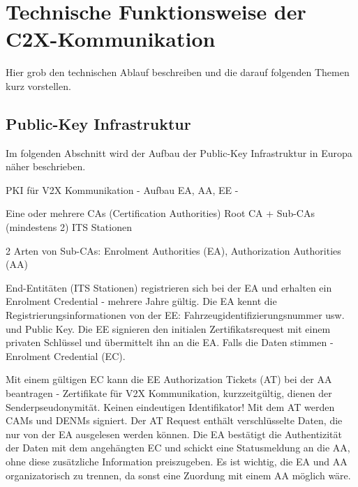 
\section{Technische  Funktionsweise der C2X-Kommunikation}
\label{ch:FirstContentSection}


Hier grob den technischen Ablauf beschreiben und die darauf folgenden Themen kurz vorstellen.

\subsection{Public-Key Infrastruktur}
\label{sec:FirstContentSection:FirstSubSection}
Im folgenden Abschnitt wird der Aufbau der Public-Key Infrastruktur in Europa näher beschrieben. 

PKI für V2X Kommunikation - Aufbau EA, AA, EE - \cite{Strubbe2017}

Eine oder mehrere CAs (Certification Authorities) 
Root CA + Sub-CAs (mindestens 2)
ITS Stationen

2 Arten von Sub-CAs: Enrolment Authorities (EA), Authorization Authorities (AA)

End-Entitäten (ITS Stationen) registrieren sich bei der EA und erhalten ein Enrolment Credential - mehrere Jahre gültig. Die EA kennt  die Registrierungsinformationen von der EE: Fahrzeugidentifizierungsnummer usw. und Public Key. Die EE signieren den initialen Zertifikatsrequest mit einem privaten Schlüssel und übermittelt ihn an die EA. Falls die Daten stimmen - Enrolment Credential (EC).

Mit einem gültigen EC kann die EE Authorization Tickets (AT) bei der AA beantragen - Zertifikate für V2X Kommunikation, kurzzeitgültig, dienen der Senderpseudonymität. Keinen eindeutigen Identifikator! Mit dem AT werden CAMs und DENMs signiert. Der AT Request enthält verschlüsselte Daten, die nur von der EA ausgelesen werden können. Die EA bestätigt die Authentizität der Daten mit dem angehängten EC und schickt eine Statusmeldung an die AA, ohne diese zusätzliche Information preiszugeben. Es ist wichtig, die EA und AA organizatorisch zu trennen, da sonst eine Zuordung mit einem AA möglich wäre.

